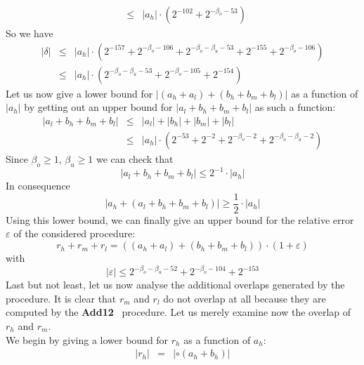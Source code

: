 \documentclass[a4paper,10pt,twoside]{article}
\newenvironment{proof}[1][Proof]{\begin{trivlist}
\item[\hskip \labelsep {\bfseries #1}]}{\end{trivlist}}
\newcommand{\hi}{\ensuremath{\mathit{h}}}
\newcommand{\mi}{\ensuremath{\mathit{m}}}
\newcommand{\lo}{\ensuremath{\mathit{l}}}
\newcommand{\Add}{{\bf Add12}}
\renewcommand{\epsilon}{\varepsilon}
\begin{document}
\begin{proof}
\begin{eqnarray*}
& \leq & \left \vert a_\hi \right \vert \cdot \left( 2^{-102} + 2^{-\beta_o -53} \right)
\end{eqnarray*}
So we have
\begin{eqnarray*}
\left \vert \delta \right \vert & \leq & \left \vert a_\hi \right \vert \cdot
\left( 2^{-157} + 2^{-\beta_o-106} + 2^{-\beta_o-\beta_u-53} + 2^{-155} + 2^{-\beta_o-106} \right) \\
& \leq & \left \vert a_\hi \right \vert \cdot
\left( 2^{-\beta_o-\beta_u-53} + 2^{-\beta_o-105} + 2^{-154} \right)
\end{eqnarray*}
Let us now give a lower bound for
$\left \vert \left( a_\hi + a_\lo \right) + \left( b_\hi + b_\mi + b_\lo \right) \right \vert$ as a function of
$\left \vert a_\hi \right \vert$ by getting out an upper bound for
$\left \vert a_\lo + b_\hi + b_\mi + b_\lo \right \vert$ as such a function:
\begin{eqnarray*}
\left \vert a_\lo + b_\hi + b_\mi + b_\lo \right \vert & \leq &
\left \vert a_\lo \right \vert + \left \vert b_\hi \right \vert + \left \vert b_\mi \right \vert + \left \vert b_\lo \right \vert \\
& \leq & \left \vert a_\hi \right \vert \cdot \left( 2^{-53} + 2^{-2} + 2^{-\beta_o-2} + 2^{-\beta_o-\beta_u-2} \right)
\end{eqnarray*}
Since $\beta_o \geq 1$, $\beta_u \geq 1$ we can check that
$$\left \vert a_\lo + b_\hi + b_\mi + b_\lo \right \vert \leq 2^{-1} \cdot \left \vert a_\hi \right \vert$$
In consequence
$$\left \vert a_\hi + \left( a_\lo + b_\hi + b_\mi + b_\lo \right) \right \vert \geq \frac{1}{2} \cdot \left \vert a_\hi \right \vert$$
Using this lower bound, we can finally give an upper bound for the relative error $\epsilon$ of the considered procedure:
$$r_\hi + r_\mi + r_\lo = \left( \left( a_\hi + a_\lo \right) + \left( b_\hi + b_\mi + b_\lo \right) \right) \cdot \left( 1 + \epsilon \right)$$
with
$$\left \vert \epsilon \right \vert \leq 2^{-\beta_o-\beta_u-52} + 2^{-\beta_o-104} + 2^{-153}$$
Last but not least, let us now analyse the additional overlaps generated by the procedure. It is clear that
$r_\mi$ and $r_\lo$ do not overlap at all because they are computed by the \Add~ procedure.
Let us merely examine now the overlap of $r_\hi$ and $r_\mi$. \\
We begin by giving a lower bound for $r_\hi$ as a function of $a_\hi$:
\begin{eqnarray*}
\left \vert r_\hi \right \vert & = & \left \vert \circ \left( a_\hi + b_\hi \right) \right \vert \\

\end{eqnarray*}
\end{proof}
\end{document}
